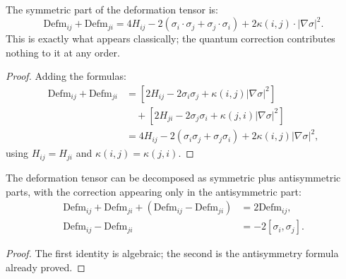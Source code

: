 \begin{theorem}
The symmetric part of the deformation tensor is:
\[
\text{Defm}_{ij} + \text{Defm}_{ji} = 4 H_{ij} - 2(\sigma_i \cdot \sigma_j + \sigma_j \cdot \sigma_i) + 2 \kappa(i,j) \cdot |\nabla \sigma|^2 .
\]
This is exactly what appears classically; the quantum correction contributes nothing to it at any order.
\begin{proof}
Adding the formulas:
\begin{align}
\text{Defm}_{ij} + \text{Defm}_{ji} &= [2 H_{ij} - 2 \sigma_i \sigma_j + \kappa(i,j) |\nabla \sigma|^2] \\
&\quad + [2 H_{ji} - 2 \sigma_j \sigma_i + \kappa(j,i) |\nabla \sigma|^2] \\
&= 4 H_{ij} - 2(\sigma_i \sigma_j + \sigma_j \sigma_i) + 2 \kappa(i,j) |\nabla \sigma|^2 ,
\end{align}
using $H_{ij} = H_{ji}$ and $\kappa(i,j) = \kappa(j,i)$.
\end{proof}
\end{theorem}

\begin{theorem}
The deformation tensor can be decomposed as symmetric plus antisymmetric parts, with the correction appearing only in the antisymmetric part:
\begin{align}
\text{Defm}_{ij} + \text{Defm}_{ji} + (\text{Defm}_{ij} - \text{Defm}_{ji}) &= 2 \text{Defm}_{ij} , \\
\text{Defm}_{ij} - \text{Defm}_{ji} &= -2 [\sigma_i, \sigma_j] .
\end{align}
\begin{proof}
The first identity is algebraic; the second is the antisymmetry formula already proved.
\end{proof}
\end{theorem}

